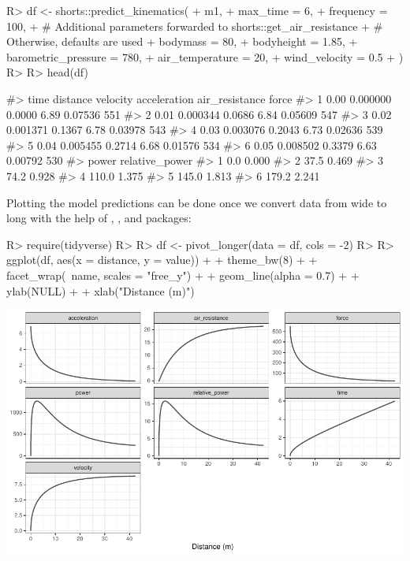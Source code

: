 \documentclass[
]{jss}
\begin{document}
\begin{CodeChunk}
\begin{CodeInput}
R> df <- shorts::predict_kinematics(
+   m1,
+   max_time = 6,
+   frequency = 100,
+   # Additional parameters forwarded to shorts::get_air_resistance
+   # Otherwise, defaults are used
+   bodymass = 80,
+   bodyheight = 1.85,
+   barometric_pressure = 780,
+   air_temperature = 20,
+   wind_velocity = 0.5
+ )
R> 
R> head(df)
\end{CodeInput}
\begin{CodeOutput}
#>   time distance velocity acceleration air_resistance force
#> 1 0.00 0.000000   0.0000         6.89        0.07536   551
#> 2 0.01 0.000344   0.0686         6.84        0.05609   547
#> 3 0.02 0.001371   0.1367         6.78        0.03978   543
#> 4 0.03 0.003076   0.2043         6.73        0.02636   539
#> 5 0.04 0.005455   0.2714         6.68        0.01576   534
#> 6 0.05 0.008502   0.3379         6.63        0.00792   530
#>   power relative_power
#> 1   0.0          0.000
#> 2  37.5          0.469
#> 3  74.2          0.928
#> 4 110.0          1.375
#> 5 145.0          1.813
#> 6 179.2          2.241
\end{CodeOutput}
\end{CodeChunk}

Plotting the model predictions can be done once we convert data from wide to long with the help of  \citep{R-dplyr},  \citep{R-tidyr}, and  \citep{R-tidyverse} packages:

\begin{CodeChunk}
\begin{CodeInput}
R> require(tidyverse)
R> 
R> df <- pivot_longer(data = df, cols = -2)
R> 
R> ggplot(df, aes(x = distance, y = value)) +
+   theme_bw(8) +
+   facet_wrap(~name, scales = "free_y") +
+   geom_line(alpha = 0.7) +
+   ylab(NULL) +
+   xlab("Distance (m)")
\end{CodeInput}


\begin{center}\includegraphics[width=1\linewidth]{paper_files/figure-latex/unnamed-chunk-8-1} \end{center}

\end{CodeChunk}
\end{document}
